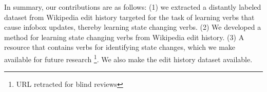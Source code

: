 In summary, our contributions are as follows: (1) we  extracted a  distantly labeled dataset from Wikipedia edit history targeted for the task of  learning verbs that cause  infobox updates, thereby learning state changing verbs.  (2) We developed a method for learning state changing verbs from Wikipedia edit history.
(3) A resource that contains verbs for identifying state changes, which we make available for future research \footnote{URL retracted for blind reviews}. We also make the edit history dataset available.
